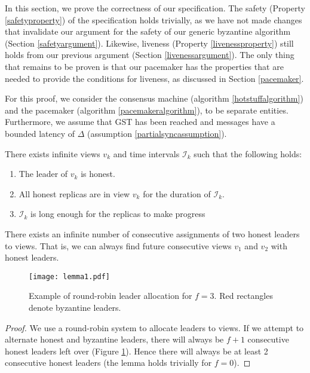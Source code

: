 In this section, we prove the correctness of our specification. The safety (Property \ref{safetyproperty}) of the specification holds trivially, as we have not made changes that invalidate our argument for the safety of our generic byzantine algorithm (Section \ref{safetyargument}). Likewise, liveness (Property \ref{livenessproperty}) still holds from our previous argument (Section \ref{livenessargument}). The only thing that remains to be proven is that our pacemaker has the properties that are needed to provide the conditions for liveness, as discussed in Section \ref{pacemaker}.

For this proof, we consider the consensus machine (algorithm \ref{hotstuffalgorithm}) and the pacemaker (algorithm \ref{pacemakeralgorithm}), to be separate entities. Furthermore, we assume that GST has been reached and messages have a bounded latency of $\Delta$ (assumption \ref{partialsyncassumption}).

\begin{theorem} \label{viewsync}
	There exists infinite views $v_k$ and time intervals $\mathcal{I}_k$ such that the following holds:
	\begin{enumerate}
		\item The leader of $v_k$ is honest.
		\item All honest replicas are in view $v_k$ for the duration of $\mathcal{I}_k$.
		\item $\mathcal{I}_k$ is long enough for the replicas to make progress
	\end{enumerate}
\end{theorem}

\begin{lemma} \label{viewslemma}
	There exists an infinite number of consecutive assignments of two honest leaders to views. That is, we can always find future consecutive views $v_1$ and $v_2$ with honest leaders.
\end{lemma}

\begin{figure}[h!]
	\centering
	\texttt{[image: lemma1.pdf]}
	\caption{Example of round-robin leader allocation for $f = 3$. Red rectangles denote byzantine leaders.}
	\label{lemma1diagram}
\end{figure}

\begin{proof}
	We use a round-robin system to allocate leaders to views. If we attempt to alternate honest and byzantine leaders, there will always be $f + 1$ consecutive honest leaders left over (Figure \ref{lemma1diagram}). Hence there will always be at least 2 consecutive honest leaders (the lemma holds trivially for $f = 0$).
\end{proof}

